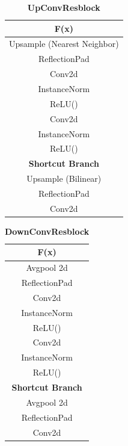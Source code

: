 \documentclass[10pt,twocolumn,letterpaper]{article}
\begin{document}
\begin{table}
        \centering %
        \begin{tabular}{c} %
        \toprule %
        \textbf{F(x)}\\%
        \midrule %
        Upsample (Nearest Neighbor) \\
        ReflectionPad \\
        Conv2d \\
        InstanceNorm\\ %
        ReLU() \\
        Conv2d \\
        InstanceNorm\\ %
        ReLU() \\
        \midrule %
        \textbf{Shortcut Branch}\\
        \midrule %
        Upsample (Bilinear) \\
        ReflectionPad\\
        Conv2d \\
        \bottomrule %
        \end{tabular}
        \caption{        \label{table:upconvresblock} \textbf{UpConvResblock}} %
\end{table}

\begin{table}
        \centering %
        \begin{tabular}{c} %
        \toprule %
        \textbf{F(x)}\\%
        \midrule
        Avgpool 2d \\
        ReflectionPad \\
        Conv2d \\
        InstanceNorm\\ %
        ReLU() \\
        Conv2d \\
        InstanceNorm\\ %
        ReLU() \\
        \midrule%
        \textbf{Shortcut Branch}\\
        \midrule %
        Avgpool 2d \\
        ReflectionPad\\
        Conv2d \\
        \bottomrule%
        \end{tabular}
        \caption{\label{table:downconvresblock} \textbf{DownConvResblock}} 
\end{table}
\end{document}
